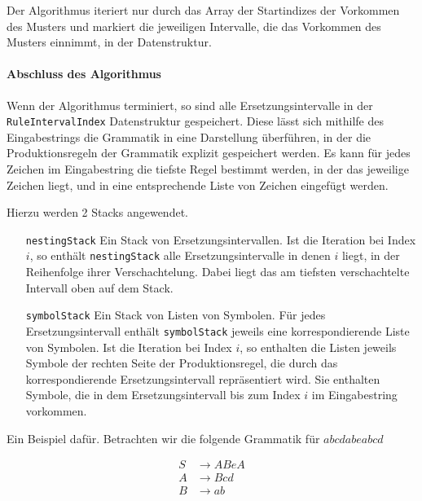 Der Algorithmus iteriert nur durch das Array der Startindizes der Vorkommen des Musters und markiert die jeweiligen Intervalle, die das Vorkommen des Musters einnimmt, in der Datenstruktur. 

\paragraph{Abschluss des Algorithmus}

Wenn der Algorithmus terminiert, so sind alle Ersetzungsintervalle in der \texttt{RuleIntervalIndex} Datenstruktur gespeichert.
Diese lässt sich mithilfe des Eingabestrings die Grammatik in eine Darstellung überführen, in der die Produktionsregeln der Grammatik explizit gespeichert werden.
Es kann für jedes Zeichen im Eingabestring die tiefste Regel bestimmt werden, in der das jeweilige Zeichen liegt, und in eine entsprechende Liste von Zeichen eingefügt werden.

Hierzu werden 2 Stacks angewendet.
\begin{itemize}[leftmargin=2cm]
    \item[\texttt{nestingStack}] Ein Stack von Ersetzungsintervallen. Ist die Iteration bei Index $i$, so enthält \texttt{nestingStack} alle Ersetzungsintervalle in denen $i$ liegt, in der Reihenfolge ihrer Verschachtelung. Dabei liegt das am tiefsten verschachtelte Intervall oben auf dem Stack.
    \item[\texttt{symbolStack}] Ein Stack von Listen von Symbolen. Für jedes Ersetzungsintervall enthält \texttt{symbolStack} jeweils eine korrespondierende Liste von Symbolen. 
    Ist die Iteration bei Index $i$, so enthalten die Listen jeweils Symbole der rechten Seite der Produktionsregel, die durch das korrespondierende Ersetzungsintervall repräsentiert wird. Sie enthalten Symbole, die in dem Ersetzungsintervall bis zum Index $i$ im Eingabestring vorkommen. 
\end{itemize} 

Ein Beispiel dafür. Betrachten wir die folgende Grammatik für $abcdabeabcd$

\begin{align*}
    S &\rightarrow ABeA\\
    A &\rightarrow Bcd\\
    B &\rightarrow ab\\
\end{align*}


